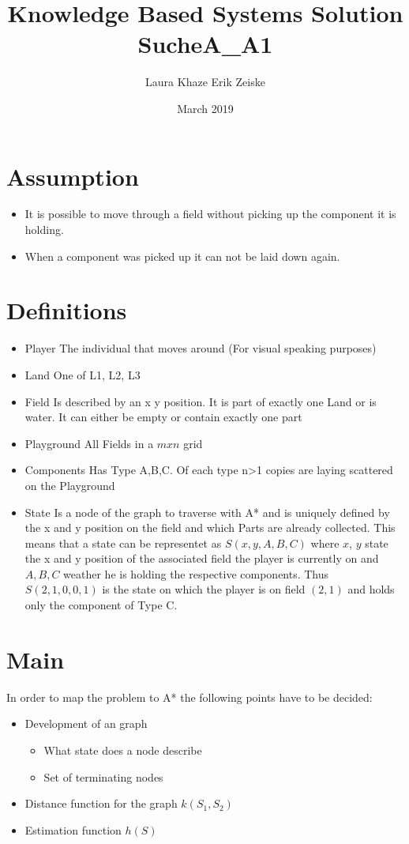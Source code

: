 \documentclass{article}
\title{Knowledge Based Systems Solution SucheA_A1}
\author{Laura Khaze \amp Erik Zeiske}
\date{March 2019}
\begin{document}
\section{Assumption}
\begin{itemize}
    \item It is possible to move through a field without picking up the component it is holding.
    \item When a component was picked up it can not be laid down again.
\end{itemize}
\section{Definitions}
\begin{itemize}
    \item{Player} The individual that moves around (For visual speaking purposes)
    \item{Land} One of L1, L2, L3
    \item{Field} Is described by an x y position. It is part of exactly one Land or is water. It can either be empty or contain exactly one part
    \item{Playground} All Fields in a $m x n$ grid
    \item{Components} Has Type A,B,C. Of each type n>1 copies are laying scattered on the Playground
    \item{State} \label{definition_state} Is a node of the graph to traverse with A* and is uniquely defined by the x and y position on the field and which Parts are already collected. This means that a state can be representet as $S(x,y,A,B,C)$ where $x$, $y$ state the x and y position of the associated field the player is currently on and $A, B, C$ weather he is holding the respective components. Thus $S(2,1,0,0,1)$ is the state on which the player is on field $(2,1)$ and holds only the component of Type C.
\end{itemize}

\section{Main}
In order to map the problem to A* the following points have to be decided:
\begin{itemize}
    \item Development of an graph
        \begin{itemize}
            \item What state does a node describe
            \item Set of terminating nodes
        \end{itemize}
    \item Distance function for the graph $k(S_1, S_2)$
    \item Estimation function $h(S)$
\end{itemize}
\end{document}
